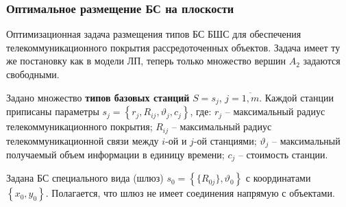 \begin{frame}
    \frametitle{Оптимальное размещение БС на плоскости}
    \justifying

    Оптимизационная задача размещения типов БС БШС для обеспечения телекоммуникационного покрытия рассредоточенных объектов. Задача имеет ту же постановку как в модели ЛП, теперь  только множество вершин $A_2$ задаются свободными. 

    \bigskip
    
    Задано множество \textbf{типов базовых станций} $S = s_j$, $j=\overline{1,m}$. Каждой станции приписаны параметры $s_j = \left\{r_j, R_{ij}, \vartheta_j, c_j \right\}$, где:
    $r_j$ -- максимальный радиус телекоммуникационного покрытия; $R_{ij}$ -- максимальный радиус телекоммуникационной связи между $i$-ой и $j$-ой станциями; $\vartheta_j$ -- максимальный получаемый объем информации в единицу времени; $c_j$ -- стоимость станции.
    
    \bigskip
    Задана БС специального вида (шлюз) $s_0 = \left\{ \{R_{0j}\}, \vartheta_0 \right\}$ с координатами $\left\{x_0, y_0 \right\}$.  Полагается, что шлюз не имеет соединения напрямую с объектами. 
    \bigskip

\end{frame}

